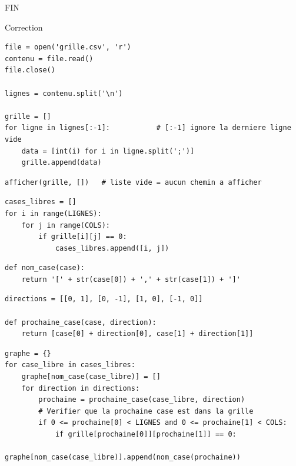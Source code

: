 \begin{center}
FIN
\end{center}
 
\cleardoublepage

\ifdef{\public}{}{\pagestyle{correction}}

\begin{center}
\Large{Correction}
\end{center}

\reponse{}

\begin{verbatim}
file = open('grille.csv', 'r')
contenu = file.read()
file.close()

lignes = contenu.split('\n')

grille = []
for ligne in lignes[:-1]:           # [:-1] ignore la derniere ligne vide
    data = [int(i) for i in ligne.split(';')]
    grille.append(data)
\end{verbatim}

\reponse{}

\begin{verbatim}
afficher(grille, [])   # liste vide = aucun chemin a afficher
\end{verbatim}

\reponse{}

\begin{verbatim}
cases_libres = []
for i in range(LIGNES):
    for j in range(COLS):
        if grille[i][j] == 0:
            cases_libres.append([i, j])
\end{verbatim}

\reponse{}

\begin{verbatim}
def nom_case(case):
    return '[' + str(case[0]) + ',' + str(case[1]) + ']'
\end{verbatim}

\reponse{}

\begin{verbatim}
directions = [[0, 1], [0, -1], [1, 0], [-1, 0]]

def prochaine_case(case, direction):
    return [case[0] + direction[0], case[1] + direction[1]]
\end{verbatim}

\reponse{}

\begin{verbatim}
graphe = {}
for case_libre in cases_libres:
    graphe[nom_case(case_libre)] = []
    for direction in directions:
        prochaine = prochaine_case(case_libre, direction)
        # Verifier que la prochaine case est dans la grille
        if 0 <= prochaine[0] < LIGNES and 0 <= prochaine[1] < COLS:
            if grille[prochaine[0]][prochaine[1]] == 0:
                graphe[nom_case(case_libre)].append(nom_case(prochaine))
\end{verbatim}


